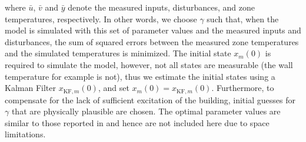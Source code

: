 \noindent
where $\bar u$, $\bar v$ and $\bar y$ denote the measured inputs, disturbances, and zone temperatures, respectively. In other words, we choose $\gamma$ such that, when the model is simulated with this set of parameter values and the measured inputs and disturbances, the sum of squared errors between the measured zone temperatures and the simulated temperatures is minimized.
The initial state $x_m(0)$ is required to simulate the model, however, not all states are measurable (the wall temperature for example is not), thus we estimate the initial states using a Kalman Filter $x_{\text{KF},m}(0)$, and set  $x_m(0) = x_{\text{KF},m}(0)$.
Furthermore, to compensate for the lack of sufficient excitation of the building, initial guesses for $\gamma$ that are physically plausible are chosen. The optimal parameter values are similar to those reported in \cite{Qie} and hence are not included here due to space limitations.


